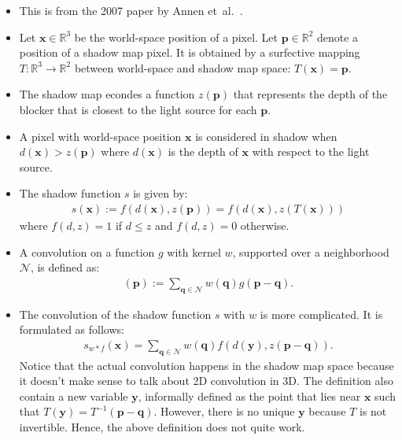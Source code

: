 \documentclass[10pt]{article}
\newcommand{\ve}[1]{\mathbf{#1}}
\newcommand{\etal}{{et~al.}}
\newcommand{\ra}{\rightarrow}
\newcommand{\Real}{\mathbb{R}}
\begin{document}
  \begin{itemize}
  	\item This is from the 2007 paper by Annen \etal\ \cite{Annen:2007}.

	\item Let $\ve{x} \in \Real^3$ be the world-space position of a pixel.  Let $\ve{p} \in \Real^2$ denote a position of a shadow map pixel.  It is obtained by a surfective mapping $T: \Real^3 \ra \Real^2$ between world-space and shadow map space: $T(\ve{x}) = \ve{p}.$

	\item The shadow map econdes a function $z(\ve{p})$ that represents the depth of the blocker that is closest to the light source for each $\ve{p}$.

	\item A pixel with world-space position $\ve{x}$ is considered in shadow when $d(\ve{x}) > z(\ve{p})$ where $d(\ve{x})$ is the depth of $\ve{x}$ with respect to the light source.
	
	\item The shadow function $s$ is given by:
	\begin{align*}
		s(\ve{x}) := f(d(\ve{x}), z(\ve{p})) = f(d(\ve{x}), z(T(\ve{x})))
	\end{align*}
	where $f(d,z) = 1$ if $d \leq z$ and $f(d,z) = 0$ otherwise.  	

  	\item A convolution on a function $g$ with kernel $w$, supported over a neighborhood $\mathcal{N}$, is defined as:
  	\begin{align*}
  		[w * g](\ve{p}) := \sum_{\ve{q} \in \mathcal{N}} w(\ve{q})g(\ve{p} - \ve{q}).
  	\end{align*}

  	\item The convolution of the shadow function $s$ with $w$ is more complicated.  It is formulated as follows:
  	\begin{align*}
  		s_{w*f}(\ve{x}) = \sum_{\ve{q} \in \mathcal{N}} w(\ve{q}) f(d(\ve{y}), z(\ve{p} - \ve{q})).
  	\end{align*}
  	Notice that the actual convolution happens in the shadow map space because it doesn't make sense to talk about 2D convolution in 3D.  The definition also contain a new variable $\ve{y}$, informally defined as the point that lies near $\ve{x}$ such that $T(\ve{y}) = T^{-1}(\ve{p} - \ve{q})$.  However, there is no unique $\ve{y}$ because $T$ is not invertible.  Hence, the above definition does not quite work.


\end{itemize}
\end{document}
